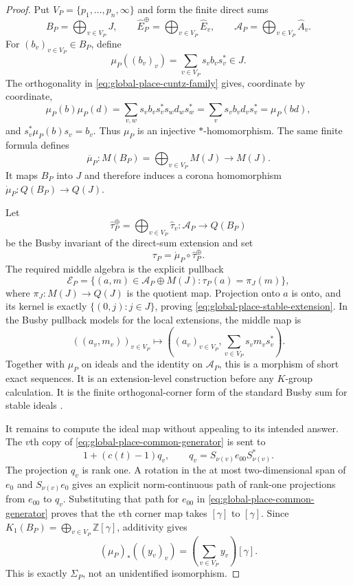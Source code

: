 \begin{proof}
Put $V_P=\{p_1,\ldots,p_n,\infty\}$ and form the finite direct sums
\[
 B_P=\bigoplus_{v\in V_P}J,
 \qquad
 \widehat E_P^\oplus=\bigoplus_{v\in V_P}\widehat E_v,
 \qquad
 \mathcal A_P=\bigoplus_{v\in V_P}\widehat A_v.
\]
For $(b_v)_{v\in V_P}\in B_P$, define
\begin{equation}
 \mu_P((b_v)_v)=\sum_{v\in V_P}s_vb_vs_v^*\in J.
 \label{eq:global-place-ideal-map}
\end{equation}
The orthogonality in \eqref{eq:global-place-cuntz-family} gives, coordinate by
coordinate,
\[
 \mu_P(b)\mu_P(d)
 =\sum_{v,w}s_vb_vs_v^*s_wd_ws_w^*
 =\sum_vs_vb_vd_vs_v^*=\mu_P(bd),
\]
and $s_v^*\mu_P(b)s_v=b_v$.  Thus $\mu_P$ is an injective
$*$-homomorphism.  The same finite formula defines
\[
 \overline\mu_P:M(B_P)=\bigoplus_{v\in V_P}M(J)\longrightarrow M(J).
\]
It maps $B_P$ into $J$ and therefore induces a corona homomorphism
$\dot\mu_P:Q(B_P)\to Q(J)$.

Let
\[
 \widehat\tau_P^\oplus=\bigoplus_{v\in V_P}\widehat\tau_v:
 \mathcal A_P\longrightarrow Q(B_P)
\]
be the Busby invariant of the direct-sum extension and set
\begin{equation}
 \tau_P=\dot\mu_P\circ\widehat\tau_P^\oplus.
 \label{eq:global-place-busby-sum}
\end{equation}
The required middle algebra is the explicit pullback
\begin{equation}
 \mathcal E_P=
 \{(a,m)\in\mathcal A_P\oplus M(J):
       \tau_P(a)=\pi_J(m)\},
 \label{eq:global-place-busby-pullback}
\end{equation}
where $\pi_J:M(J)\to Q(J)$ is the quotient map.  Projection onto $a$ is onto,
and its kernel is exactly $\{(0,j):j\in J\}$, proving
\eqref{eq:global-place-stable-extension}.  In the Busby pullback models for the
local extensions, the middle map is
\begin{equation}
 ((a_v,m_v))_{v\in V_P}
 \longmapsto
 \left((a_v)_{v\in V_P},
       \sum_{v\in V_P}s_vm_vs_v^*\right).
 \label{eq:global-place-middle-map}
\end{equation}
Together with $\mu_P$ on ideals and the identity on $\mathcal A_P$, this is a
morphism of short exact sequences.  It is an extension-level construction
before any $K$-group calculation.  It is the finite orthogonal-corner form of
the standard Busby sum for stable ideals
\cite[Sections~15.6 and 15.9, pp.~149--150, 156]{blackadar1986}.

It remains to compute the ideal map without appealing to its intended answer.
The $v$th copy of \eqref{eq:global-place-common-generator} is sent to
\[
 1+(c(t)-1)q_v,
 \qquad q_v=S_{\nu(v)}e_{00}S_{\nu(v)}^*.
\]
The projection $q_v$ is rank one.  A rotation in the at most two-dimensional
span of $e_0$ and $S_{\nu(v)}e_0$ gives an explicit norm-continuous path of
rank-one projections from $e_{00}$ to $q_v$.  Substituting that path for
$e_{00}$ in \eqref{eq:global-place-common-generator} proves that the $v$th
corner map takes $[\gamma]$ to $[\gamma]$.  Since
$K_1(B_P)=\bigoplus_{v\in V_P}\mathbb Z[\gamma]$, additivity gives
\[
 (\mu_P)_*((y_v)_v)=\left(\sum_{v\in V_P}y_v\right)[\gamma].
\]
This is exactly $\Sigma_P$, not an unidentified isomorphism.


\end{proof}
